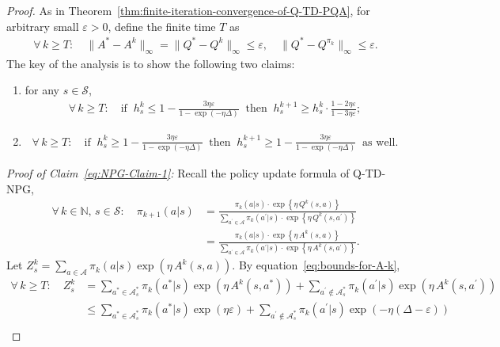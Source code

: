 \documentclass[10pt,a4paper]{amsart}
\newcommand{\calA}{\mathcal{A}}
\newcommand{\calS}{\mathcal{S}}
\newcommand{\ls}{\left}
\newcommand{\rs}{\right}
\begin{document}
\begin{proof}
    As in Theorem~\ref{thm:finite-iteration-convergence-of-Q-TD-PQA}, for arbitrary small $\varepsilon > 0$,  define the finite time $T$ as
    \begin{align*}
        \forall\, k\geq T: \quad \| A^* - A^k \|_\infty = \| Q^* - Q^k \|_\infty \leq \varepsilon, \quad \| Q^* - Q^{\pi_k} \|_\infty \leq \varepsilon.
    \end{align*}
    The key of the analysis is to show  the following two claims:
    \begin{enumerate}[label=(\Roman*)]
        \item \label{eq:NPG-Claim-1} for any $s\in\calS$, 
        \begin{align}
            \forall\, k\geq T: \quad \mbox{if} \;\; h_s^{k} \leq 1 - \frac{3\eta \varepsilon}{1-\exp(-\eta\Delta)} \;\; \mbox{then} \;\; h^{k+1}_s \geq h_s^k \cdot \frac{1-2\eta\varepsilon}{1-3\eta\varepsilon};
            \label{eq:NPG-property-1}
        \end{align}
        \item \label{eq:NPG-Claim-2} 
        \begin{align}
            \forall\, k \geq T: \quad \mbox{if} \;\; h_s^k \geq 1 - \frac{3\eta\varepsilon}{1-\exp(-\eta\Delta)} \;\; \mbox{then} \;\; h_s^{k+1} \geq 1 - \frac{3\eta\varepsilon}{1-\exp(-\eta\Delta)} \;\; \mbox{as well}.
        \end{align}
    \end{enumerate}
    \textit{Proof of Claim~\ref{eq:NPG-Claim-1}:} Recall the policy update formula of Q-TD-NPG,
    \begin{align*}
        \forall\, k\in\mathbb{N}, \, s\in\calS: \quad \pi_{k+1}(a|s) &= \frac{\pi_k(a|s) \cdot \exp \ls\{ \eta\, Q^k(s,a) \rs\}}{\sum_{a^\prime\in\calA} \pi_k(a^\prime|s) \cdot \exp \ls\{ \eta\, Q^k(s,a^\prime) \rs\}} \\
        &= \frac{\pi_k(a|s) \cdot \exp \ls\{ \eta\, A^k(s,a) \rs\}}{\sum_{a^\prime\in\calA} \pi_k(a^\prime|s) \cdot \exp \ls\{ \eta\, A^k(s,a^\prime) \rs\}}.
    \end{align*}
    Let $Z^k_s = \sum_{a\in\calA} \pi_k(a|s) \exp (\eta \, A^k(s,a))$. By equation~\eqref{eq:bounds-for-A-k}, 
    \begin{align*}
        \forall\, k \geq T: \quad Z_s^k &= \sum_{a^* \in\calA^*_s} \pi_k(a^*|s) \exp (\eta\, A^k(s,a^*)) + \sum_{a^\prime\not\in\calA^*_s} \pi_k(a^\prime|s) \exp (\eta\, A^k(s,a^\prime)) \\
        &\leq \sum_{a^*\in\calA^*_s} \pi_k(a^*|s) \exp(\eta \varepsilon) + \sum_{a^\prime\not\in\calA^*_s} \pi_k(a^\prime|s) \exp (-\eta (\Delta - \varepsilon)) \\

\end{align*}
\end{proof}
\end{document}
